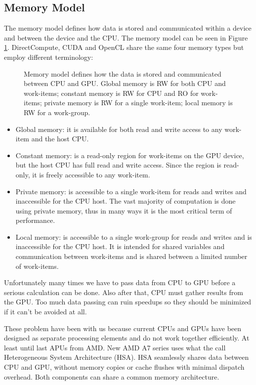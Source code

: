 \documentclass[review]{elsarticle}
\begin{document}
\subsection{Memory Model}

The memory model defines how data is stored and communicated within a device and between the device and the CPU. The memory model can be seen in Figure \ref{figure:memory}. DirectCompute, CUDA and OpenCL share the same four memory types but employ different terminology:

\begin{figure}
\centerline{}
\caption{Memory model defines how the data is stored and communicated between CPU and GPU. Global memory is RW for both CPU and work-items; constant memory is RW for CPU and RO for work-items; private memory is RW for a single work-item; local memory is RW for a work-group.}
\label{figure:memory}
\end{figure}

\begin{itemize}
\item Global memory: it is available for both read and write access to any work-item and the host CPU.
\item Constant memory: is a read-only region for work-items on the GPU device, but the host CPU has full read and write access. Since the region is read-only, it is freely accessible to any work-item.
\item Private memory: is accessible to a single work-item for reads and writes and inaccessible for the CPU host. The vast majority of computation is done using private memory, thus in many ways it is the most critical term of performance.
\item Local memory: is accessible to a single work-group for reads and writes and is inaccessible for the CPU host. It is intended for shared variables and communication between work-items and is shared between a limited number of work-items.
\end{itemize} 

Unfortunately many times we have to pass data from CPU to GPU before a serious calculation can be done. Also after that, CPU must gather results from the GPU. Too much data passing can ruin speedups so they should be minimized if it can't be avoided at all.

These problem have been with us because current CPUs and GPUs have been designed as separate processing elements and do not work together efficiently. At least until last APUs from AMD. New AMD A7 series uses what the call Heterogeneous System Architecture (HSA). HSA seamlessly shares data between CPU and GPU, without memory copies or cache flushes with minimal dispatch overhead. Both components can share a common memory architecture.
\end{document}
